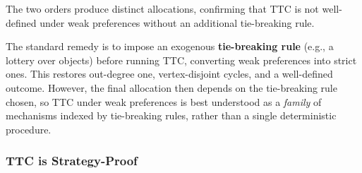 {\begin{center}
  \end{center}

  \noindent The two orders produce distinct allocations, confirming
  that TTC is not well-defined under weak preferences without an
  additional tie-breaking rule.

  \medskip
  The standard remedy is to impose an exogenous \textbf{tie-breaking
  rule} (e.g., a lottery over objects) before running TTC, converting
  weak preferences into strict ones. This restores out-degree one,
  vertex-disjoint cycles, and a well-defined outcome. However, the
  final allocation then depends on the tie-breaking rule chosen, so
  TTC under weak preferences is best understood as a \textit{family}
  of mechanisms indexed by tie-breaking rules, rather than a single
  deterministic procedure.
}

\subsubsection{TTC is Strategy-Proof}

